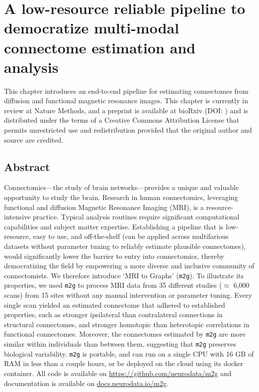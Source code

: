 \chapter[MRI to Connectomes]{A low-resource reliable pipeline to democratize multi-modal connectome estimation and analysis} \label{chap:m2g}

This chapter introduces an end-to-end pipeline for estimating connectomes from diffusion and functional magnetic resonance images. This chapter is currently in review at Nature Methods, and a preprint is available at bioRxiv (DOI: \url{}) and is distributed under the terms of a Creative Commons Attribution License that permits unrestricted use and redistribution provided that the original author and source are credited.

\pagebreak 
\section*{Abstract}
Connectomics---the study of brain networks---provides a unique and valuable opportunity to study the brain. Research in human connectomics, leveraging functional and diffusion Magnetic Resonance Imaging (MRI), is a resource-intensive practice. Typical analysis routines require significant computational capabilities and subject matter expertise. Establishing a pipeline that is low-resource, easy to use, and off-the-shelf  (can be applied across multifarious datasets without parameter tuning to reliably estimate plausible connectomes), would significantly lower the barrier to entry into connectomics, thereby democratizing the field by empowering a more diverse and inclusive community of connectomists. We therefore introduce `MRI to Graphs' (\texttt{m2g}). To illustrate its properties, we used \texttt{m2g} to process MRI data from 35 different studies ($\approx$ 6,000 scans) from 15 sites without any manual intervention or parameter tuning. Every single scan yielded an estimated connectome that adhered to established properties, such as  stronger ipsilateral than contralateral connections in structural connectomes, and stronger homotopic than heterotopic correlations in functional connectomes. Moreover, the connectomes estimated by \texttt{m2g} are more similar within individuals than between them, suggesting that \texttt{m2g} preserves biological variability. \texttt{m2g} is portable, and can run on a single CPU with 16 GB of RAM in less than a couple hours, or be deployed on the cloud using its docker container. All code is available on \url{https://github.com/neurodata/m2g} and documentation is available on \url{docs.neurodata.io/m2g}.
\pagebreak

